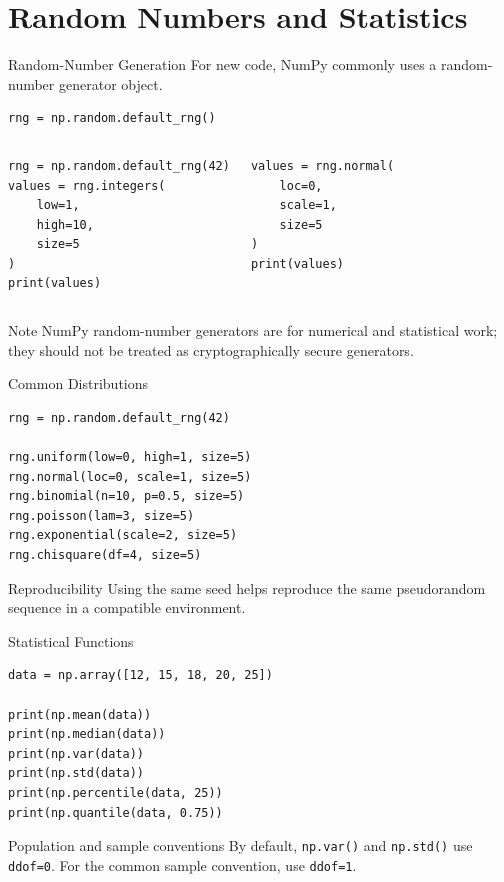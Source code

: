 \documentclass[aspectratio=169,11pt]{beamer}
\begin{document}
\section{Random Numbers and Statistics}

\begin{frame}[fragile]{Random-Number Generation}
\small
For new code, NumPy commonly uses a random-number generator object.
\begin{lstlisting}[style=py]
rng = np.random.default_rng()
\end{lstlisting}
\begin{columns}[T]
\begin{lstlisting}[style=py]
rng = np.random.default_rng(42)
values = rng.integers(
    low=1,
    high=10,
    size=5
)
print(values)
\end{lstlisting}
\begin{lstlisting}[style=py]
values = rng.normal(
    loc=0,
    scale=1,
    size=5
)
print(values)
\end{lstlisting}
\end{columns}
\begin{alertblock}{Note}
NumPy random-number generators are for numerical and statistical work; they should not be treated as cryptographically secure generators.
\end{alertblock}
\end{frame}

\begin{frame}[fragile]{Common Distributions}
\small
\begin{lstlisting}[style=py]
rng = np.random.default_rng(42)

rng.uniform(low=0, high=1, size=5)
rng.normal(loc=0, scale=1, size=5)
rng.binomial(n=10, p=0.5, size=5)
rng.poisson(lam=3, size=5)
rng.exponential(scale=2, size=5)
rng.chisquare(df=4, size=5)
\end{lstlisting}
\begin{block}{Reproducibility}
Using the same seed helps reproduce the same pseudorandom sequence in a compatible environment.
\end{block}
\end{frame}

\begin{frame}[fragile]{Statistical Functions}
\small
\begin{lstlisting}[style=py]
data = np.array([12, 15, 18, 20, 25])

print(np.mean(data))
print(np.median(data))
print(np.var(data))
print(np.std(data))
print(np.percentile(data, 25))
print(np.quantile(data, 0.75))
\end{lstlisting}
\begin{block}{Population and sample conventions}
By default, \texttt{np.var()} and \texttt{np.std()} use \texttt{ddof=0}. For the common sample convention, use \texttt{ddof=1}.
\end{block}
\end{frame}
\end{document}
